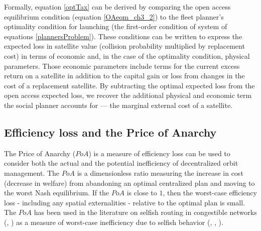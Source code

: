 \documentclass[12pt]{article}
\begin{document}
Formally, equation \ref{optTax} can be derived by comparing the open access equilibrium condition (equation \ref{OAeqm_ch3_2}) to the fleet planner's optimality condition for launching (the first-order condition of system of equations \ref{plannersProblem}). These conditions can be written to express the expected loss in satellite value (collision probability multiplied by replacement cost) in terms of economic and, in the case of the optimality condition, physical parameters. Those economic parameters include terms for the current excess return on a satellite in addition to the capital gain or loss from changes in the cost of a replacement satellite. By subtracting the optimal expected loss from the open access expected loss, we recover the additional physical and economic term the social planner accounts for --- the marginal external cost of a satellite. 


\subsection{Efficiency loss and the Price of Anarchy}

The Price of Anarchy ($PoA$) is a measure of efficiency loss can be used to consider both the actual and the potential inefficiency of decentralized orbit management. The $PoA$ is a dimensionless ratio measuring the increase in cost (decrease in welfare) from abandoning an optimal centralized plan and moving to the worst Nash equilibrium. If the $PoA$ is close to $1$, then the worst-case efficiency loss - including any spatial externalities - relative to the optimal plan is small. The $PoA$ has been used in the literature on selfish routing in congestible networks (\cite{robinson2004}, \cite{poaFirst}) as a measure of worst-case inefficiency due to selfish behavior (\cite{roughgarden2005selfish}, \cite{gairingetal2006}, \cite{roughgarden2009}).\\ %
\end{document}
